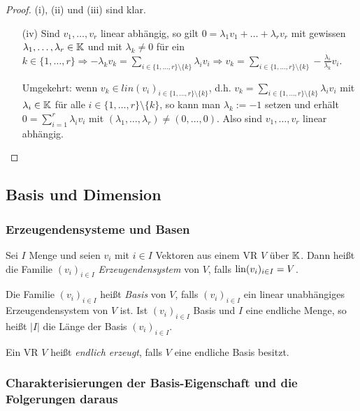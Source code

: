 \begin{proof} (i), (ii) und (iii) sind klar.
\begin{itemize}
	\item[(iv)]
	Sind $ v_1, \ldots, v_r $ linear abhängig, so gilt $ 0 = \lambda_1v_1 + \ldots + \lambda_rv_r $ mit gewissen $ \lambda_1, \ldots, \lambda_r \in \mathbb K $ und mit $ \lambda_k \neq 0 $ für ein $ k \in \{ 1, \ldots, r \} \Rightarrow -\lambda_kv_k = \sum_{i \in \{ 1, \ldots, r \} \setminus \{ k \}} \lambda_iv_i \Rightarrow v_k = \sum_{i \in \{ 1, \ldots, r \} \setminus \{ k \}} - \frac{\lambda_i}{\lambda_k}v_i $.
	
	Umgekehrt: wenn $ v_k \in lin(v_i)_{i \in \{ 1, \ldots, r \} \setminus \{ k \}} $, d.h. $ v_k = \sum_{i \in \{ 1, \ldots, r \} \setminus \{ k \}} \lambda_iv_i $ mit $ \lambda_i \in \mathbb K $ für alle $ i \in \{ 1, \ldots, r \} \setminus \{ k \} $, so kann man $ \lambda_k := -1 $ setzen und erhält $ 0 = \sum_{i = 1}^r \lambda_iv_i $ mit $ ( \lambda_1, \ldots, \lambda_r ) \neq ( 0, \ldots, 0 ) $. Also sind $ v_1, \ldots, v_r $ linear abhängig. \qedhere
\end{itemize}
\end{proof}

\subsection{Basis und Dimension}

\subsubsection{Erzeugendensysteme und Basen}

Sei $ I $ Menge und seien $ v_i $ mit $ i \in I $ Vektoren aus einem VR $ V $ über $ \mathbb K $. Dann heißt die Familie $ (v_i)_{i \in I} $ \emph{Erzeugendensystem} von $ V $, falls $ \operatorname{lin}(v_i)_{i \in I} = V $.

Die Familie $ (v_i)_{i \in I} $ heißt \emph{Basis} von $ V $, falls $ (v_i)_{i \in I} $ ein linear unabhängiges Erzeugendensystem von $ V $ ist. Ist $ (v_i)_{i \in I} $ Basis und $ I $ eine endliche Menge, so heißt $ |I| $ die Länge der Basis $ (v_i)_{i \in I} $.

Ein VR $ V $ heißt \emph{endlich erzeugt}, falls $ V $ eine endliche Basis besitzt.

\subsubsection{Charakterisierungen der Basis-Eigenschaft und die Folgerungen daraus}

